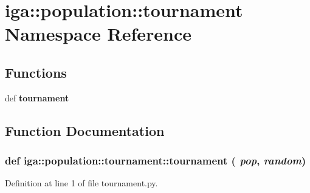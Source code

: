 \section{iga::population::tournament Namespace Reference}
\label{namespaceiga_1_1population_1_1tournament}


\subsection*{Functions}
\begin{CompactItemize}
\item 
def {\bf tournament}
\end{CompactItemize}


\subsection{Function Documentation}
\subsubsection{\setlength{\rightskip}{0pt plus 5cm}def iga::population::tournament::tournament ( {\em pop},  {\em random})}\label{namespaceiga_1_1population_1_1tournament_ab839d1468af388460639f482df22b00}




Definition at line 1 of file tournament.py.